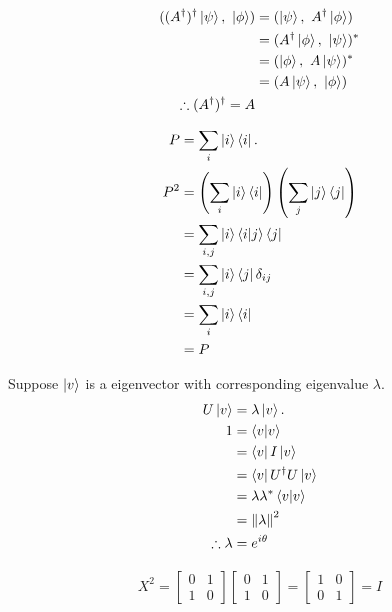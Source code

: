 \begin{align*}
	((A^\dagger)^\dagger\ket{\psi},\ \ket{\phi} )
	&= (\ket{\psi},\ A^\dagger \ket{\phi})\\
	&= (A^\dagger \ket{\phi},\ \ket{\psi})^*\\
	&= (\ket{\phi},\ A\ket{\psi})^*\\
	&= (A\ket{\psi},\ \ket{\phi})\\
	\therefore (A^\dagger)^\dagger = A
\end{align*}


\begin{align*}
	P &= \sum_i \ket{i}\bra{i}.\\
	P^2 &= \left(\sum_i \ket{i}\bra{i}\right) \left(\sum_j \ket{j}\bra{j}\right)\\
	&= \sum_{i,j} \ket{i}\braket{i | j}\bra{j}\\
	&= \sum_{i,j} \ket{i}\bra{j} \delta_{ij}\\
	&= \sum_i \ket{i}\bra{i}\\
	&= P
\end{align*}





Suppose $\ket{v}$ is a eigenvector with corresponding eigenvalue $\lambda$.
\begin{align*}
	U \ket{v} &= \lambda \ket{v}.\\
	1 &= \braket{v | v}\\
	&= \bra{v} I \ket{v}\\
	&= \bra{v} U^\dagger U \ket{v}\\
	&= \lambda \lambda^* \braket{v | v}\\
	&= \left\lVert\lambda\right\rVert^2\\
	\therefore \lambda &= e^{i \theta}
\end{align*}




\begin{align*}
	X^2 = \begin{bmatrix}
		0 & 1 \\
		1 & 0
	\end{bmatrix}
	\begin{bmatrix}
		0 & 1 \\
		1 & 0
	\end{bmatrix}
	= \begin{bmatrix}
		1 & 0 \\
		0 & 1
	\end{bmatrix} = I
\end{align*}



